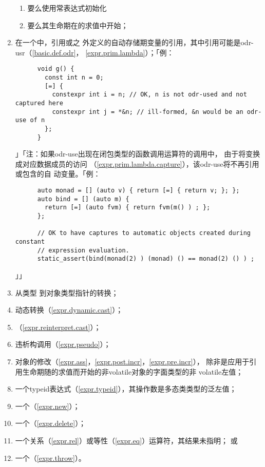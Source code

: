 \begin{enumerate}
{    \begin{enumerate}
      \item{要么使用常表达式初始化}
      \item{要么其生命期在的求值中开始；}
    \end{enumerate}}
  \item{在一个中，引用或之
    外定义的自动存储期变量的引用，其中引用可能是odr-usr（\ref{basic.def.odr}，
    \ref{expr.prim.lambda}）；「例：
    \begin{lstlisting}
      void g() {
        const int n = 0;
        [=] {
          constexpr int i = n; // OK, n is not odr-used and not captured here
          constexpr int j = *&n; // ill-formed, &n would be an odr-use of n
        };
      }
    \end{lstlisting}」「注：如果odr-use出现在闭包类型的函数调用运算符的调用中，
    由于将变换成对应数据成员的访问
    （\ref{expr.prim.lambda.capture}），该odr-use将不再引用或包含的自
    动变量。「例：
    \begin{lstlisting}
      auto monad = [] (auto v) { return [=] { return v; }; };
      auto bind = [] (auto m) {
        return [=] (auto fvm) { return fvm(m() ) ; };
      };

      // OK to have captures to automatic objects created during constant
      // expression evaluation.
      static_assert(bind(monad(2) ) (monad) () == monad(2) () ) ;
    \end{lstlisting}」」}
  \item{从类型 到对象类型指针的转换；}
  \item{动态转换（\ref{expr.dynamic.cast}）；}
  \item{（\ref{expr.reinterpret.cast}）；}
  \item{违析构调用（\ref{expr.pseudo}）；}
  \item{对象的修改（\ref{expr.ass}，\ref{expr.post.incr}，\ref{expr.pre.incr}），
    除非是应用于引用生命期随的求值而开始的非volatile对象的字面类型的非
    volatile左值；}
  \item{一个typeid表达式（\ref{expr.typeid}），其操作数是多态类类型的泛左值；}
  \item{一个（\ref{expr.new}）；}
  \item{一个（\ref{expr.delete}）；}
  \item{一个关系（\ref{expr.rel}）或等性（\ref{expr.eq}）运算符，其结果未指明；
    或}
  \item{一个（\ref{expr.throw}）。}
\end{enumerate}
